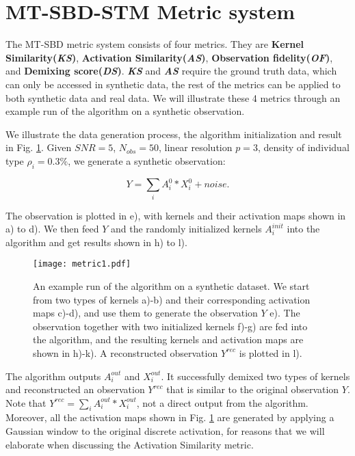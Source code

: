 \section{MT-SBD-STM Metric system}
The MT-SBD metric system consists of four metrics. They are \textbf{Kernel Similarity(\textit{KS})}, \textbf{Activation Similarity(\textit{AS})}, \textbf{Observation fidelity(\textit{OF})}, and \textbf{Demixing score(\textit{DS})}. \textbf{\textit{KS}} and \textbf{\textit{AS}} require the ground truth data, which can only be accessed in synthetic data, the rest of the metrics can be applied to both synthetic data and real data. We will illustrate these 4 metrics through an example run of the algorithm on a synthetic observation. 

We illustrate the data generation process, the algorithm initialization and result in Fig. \ref{fig:metric}. Given $SNR = 5$, $N_{obs}=50$, linear resolution $p = 3$, density of individual type $\rho_i = 0.3\%$, we generate a synthetic observation: 

\begin{equation}
	\label{eq:observation}
	Y = \sum_i A^0_i * X^0_i + noise.
\end{equation} 

The observation is plotted in e), with kernels and their activation maps shown in a) to d). We then feed $Y$ and the randomly initialized kernels $A_i^{init}$ into the algorithm and get results shown in h) to l). 

\begin{figure}
	\texttt{[image: metric1.pdf]} 
	\centering
	\caption{An example run of the algorithm on a synthetic dataset. We start from two types of kernels a)-b) and their corresponding activation maps c)-d), and use them to generate the observation $Y$ e). The observation together with two initialized kernels f)-g) are fed into the algorithm, and the resulting kernels and activation maps are shown in h)-k). A reconstructed observation $Y^{rec}$ is plotted in l).}
	\label{fig:metric}
\end{figure}

The algorithm outputs $A_i^{out}$ and $X_i^{out}$. It successfully demixed two types of kernels and reconstructed an observation $Y^{rec}$ that is similar to the original observation $Y$. Note that $Y^{rec} = \sum_i A^{out}_i * X^{out}_i$, not a direct output from the algorithm. Moreover, all the activation maps shown in Fig. \ref{fig:metric} are generated by applying a Gaussian window to the original discrete activation, for reasons that we will elaborate when discussing the Activation Similarity metric. 

